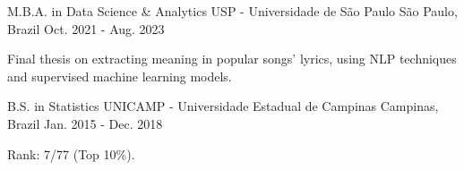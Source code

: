 \begin{cventries}
  \cventry
    {M.B.A. in Data Science \& Analytics}
    {USP - Universidade de São Paulo}
    {São Paulo, Brazil}
    {Oct. 2021 - Aug. 2023}
    {
        \begin{cvitems}
          \item {Final thesis on extracting meaning in popular songs' lyrics, using NLP techniques and supervised machine learning models.}
        \end{cvitems}
      }
\end{cventries}
\begin{cventries}
  \cventry
    {B.S. in Statistics}
    {UNICAMP - Universidade Estadual de Campinas}
    {Campinas, Brazil}
    {Jan. 2015 - Dec. 2018}
    {
        \begin{cvitems}
          \item {Rank: 7/77 (Top 10\%).}
        \end{cvitems}
      }
\end{cventries}


